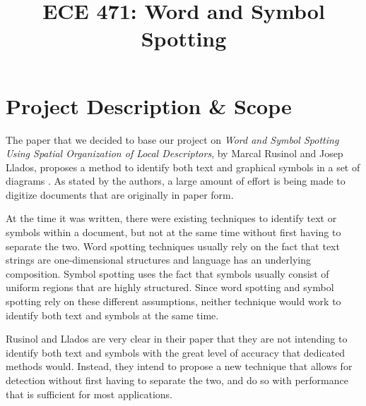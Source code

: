 \documentclass[conference]{IEEEtran}
\begin{document}
\title{ECE 471: Word and Symbol Spotting\\
}

\author{
\and
{}
}

\maketitle

\section{Project Description \& Scope}
The paper that we decided to base our project on \emph{Word and Symbol Spotting Using Spatial Organization of Local Descriptors}, by Marcal Rusinol and Josep Llados, proposes a method to identify both text and graphical symbols in a set of diagrams \cite{b1}. As stated by the authors, a large amount of effort is being made to digitize documents that are originally in paper form. 

At the time it was written, there were existing techniques to identify text or symbols within a document, but not at the same time without first having to separate the two. Word spotting techniques usually rely on the fact that text strings are one-dimensional structures and language has an underlying composition. Symbol spotting uses the fact that symbols usually consist of uniform regions that are highly structured. Since word spotting and symbol spotting rely on these different assumptions, neither technique would work to identify both text and symbols at the same time. 

Rusinol and Llados are very clear in their paper that they are not intending to identify both text and symbols with the great level of accuracy that dedicated methods would. Instead, they intend to propose a new technique that allows for detection without first having to separate the two, and do so with performance that is sufficient for most applications.
\end{document}
